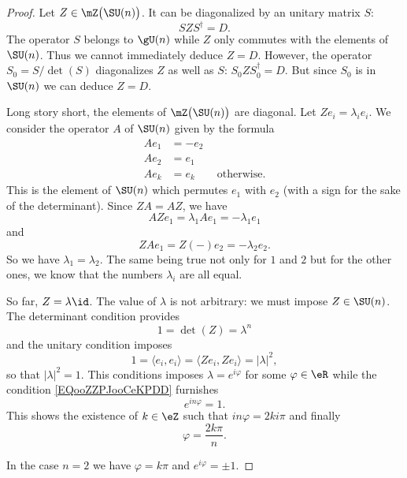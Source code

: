 \begin{proof}
	Let \( Z\in\mZ\big( \SU(n) \big)\). It can be diagonalized by an unitary matrix \( S\):
	\begin{equation}
		SZS^{\dag}=D.
	\end{equation}
	The operator \( S\) belongs to \( \gU(n)\) while \( Z\) only commutes with the elements of \( \SU(n)\). Thus we cannot immediately deduce \( Z=D\).  However, the operator \( S_0 = S/\det(S)\) diagonalizes \( Z\) as well as \( S\): \( S_0ZS_0^{\dag}=D\). But since \( S_0\) is in \( \SU(n)\) we can deduce \( Z=D\).

	Long story short, the elements of \( \mZ\big( \SU(n) \big)\) are diagonal. Let \( Ze_i=\lambda_ie_i\). We consider the operator \( A\) of \( \SU(n)\) given by the formula
	\begin{subequations}
		\begin{align}
			Ae_1 & =-e_2                       \\
			Ae_2 & =e_1                        \\
			Ae_k & =e_k\qquad\text{otherwise.}
		\end{align}
	\end{subequations}
	This is the element of \( \SU(n)\) which permutes \( e_1\) with \( e_2\) (with a sign for the sake of the determinant). Since \( ZA=AZ\), we have
	\begin{equation}
		AZe_1=\lambda_1Ae_1=-\lambda_1e_1
	\end{equation}
	and
	\begin{equation}
		ZAe_1=Z(-)e_2=-\lambda_2e_2.
	\end{equation}
	So we have \( \lambda_1=\lambda_2\). The same being true not only for \( 1\) and \( 2\) but for the other ones, we know that the numbers \( \lambda_i\) are all equal.

	So far, \( Z=\lambda\id\). The value of \( \lambda\) is not arbitrary: we must impose \( Z\in\SU(n)\). The determinant condition provides
	\begin{equation}        \label{EQooZZPJooCeKPDD}
		1=\det(Z)=\lambda^n
	\end{equation}
	and the unitary condition imposes
	\begin{equation}
		1=\langle e_i, e_i\rangle =\langle Ze_i, Ze_i\rangle =| \lambda |^2,
	\end{equation}
	so that \( | \lambda |^2=1\). This conditions imposes \( \lambda= e^{i\varphi}\) for some \( \varphi\in \eR\) while the condition \eqref{EQooZZPJooCeKPDD} furnishes
	\begin{equation}
		e^{in\varphi}=1.
	\end{equation}
	This shows the existence of \( k\in \eZ\) such that \( in\varphi=2ki\pi\) and finally
	\begin{equation}
		\varphi=\frac{ 2k\pi }{ n }.
	\end{equation}

	In the case \( n=2\) we have \( \varphi=k\pi\) and \(  e^{i\varphi}=\pm 1\).
\end{proof}

